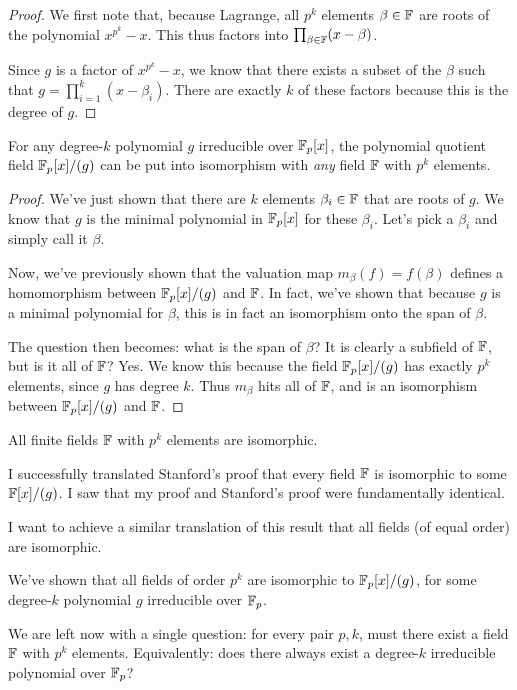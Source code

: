 \begin{proof}
  We first note that, because Lagrange, all $p^k$ elements $\beta \in
  \mathbb{F}$ are roots of the polynomial $x^{p^k} - x$. This thus factors into
  $\prod_{\beta\in\mathbb{F}} (x - \beta)$.

  Since $g$ is a factor of $x^{p^k} - x$, we know that there exists a
  subset of the $\beta$ such that $g = \prod_{i=1}^k (x - \beta_i)$.
  There are exactly $k$ of these factors because this is the degree of
  $g$.
\end{proof}

\begin{theorem}
  For any degree-$k$ polynomial $g$ irreducible over $\mathbb{F}_p[x]$, the
  polynomial quotient field $\mathbb{F}_p[x]/(g)$ can be put into isomorphism with
  \emph{any} field $\mathbb{F}$ with $p^k$ elements.
\end{theorem}

\begin{proof}
  We've just shown that there are $k$ elements $\beta_i \in \mathbb{F}$ that are
  roots of $g$. We know that $g$ is the minimal polynomial in $\mathbb{F}_p[x]$
  for these $\beta_i$. Let's pick a $\beta_i$ and simply call it
  $\beta$.

  Now, we've previously shown that the valuation map $m_\beta(f) =
  f(\beta)$ defines a homomorphism between $\mathbb{F}_p[x]/(g)$ and $\mathbb{F}$. In fact,
  we've shown that because $g$ is a minimal polynomial for $\beta$, this
  is in fact an isomorphism onto the span of $\beta$.

  The question then becomes: what is the span of $\beta$? It is clearly
  a subfield of $\mathbb{F}$, but is it all of $\mathbb{F}$? Yes. We know this because
  the field $\mathbb{F}_p[x]/(g)$ has exactly $p^k$ elements, since $g$ has degree
  $k$. Thus $m_\beta$ hits all of $\mathbb{F}$, and is an isomorphism between
  $\mathbb{F}_p[x]/(g)$ and $\mathbb{F}$.
\end{proof}

\begin{corollary}
  All finite fields $\mathbb{F}$ with $p^k$ elements are isomorphic.
\end{corollary}

\begin{remark}
   I successfully
  translated Stanford's proof that every field $\mathbb{F}$ is isomorphic to
  some $\mathbb{F}[x]/(g)$. I saw that my proof and Stanford's proof were
  fundamentally identical.

  I want to achieve a similar translation of this result that all fields
  (of equal order) are isomorphic.
\end{remark}

\begin{remark}
  We've shown that all fields of order $p^k$ are isomorphic to
  $\mathbb{F}_p[x]/(g)$, for some degree-$k$ polynomial $g$ irreducible over $\mathbb{F}_p$.

  We are left now with a single question: for every pair $p, k$, must
  there exist a field $\mathbb{F}$ with $p^k$ elements. Equivalently: does there
  always exist a degree-$k$ irreducible polynomial over $\mathbb{F}_p$?
\end{remark}

